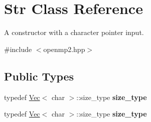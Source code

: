 \hypertarget{classStr}{}\section{Str Class Reference}
\label{classStr}


A constructor with a character pointer input.  




{\ttfamily \#include $<$openmp2.\+hpp$>$}

\subsection*{Public Types}
\begin{DoxyCompactItemize}
\item 
\mbox{\label{classStr_a8a51ef48a27e5e597fde5edd7d36f7d8}} 
typedef \hyperlink{classVec}{Vec}$<$ char $>$\+::size\+\_\+type {\bfseries size\+\_\+type}
\item 
\mbox{\label{classStr_a8a51ef48a27e5e597fde5edd7d36f7d8}} 
typedef \hyperlink{classVec}{Vec}$<$ char $>$\+::size\+\_\+type {\bfseries size\+\_\+type}
\end{DoxyCompactItemize}
